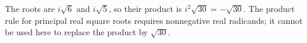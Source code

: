 The roots are $i\sqrt6$ and $i\sqrt5$, so their product is $i^2\sqrt{30}=\boxed{-\sqrt{30}}$. The product rule for principal real square roots requires nonnegative real radicands; it cannot be used here to replace the product by $\sqrt{30}$.
